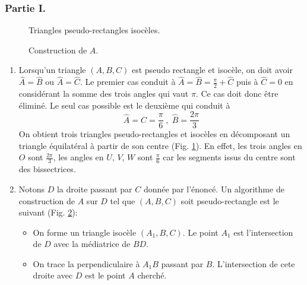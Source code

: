 \subsubsection*{Partie I.}
\begin{figure}
	\begin{center}
	
	\end{center}
\caption{Triangles pseudo-rectangles isocèles.}
\label{fig:Cpseudorec_1}
\end{figure} 
\begin{figure}
	\begin{center}
	
	\end{center}
\caption{Construction de $A$.}
\label{fig:Cpseudorec_2}
\end{figure} 

\begin{enumerate}
\item Lorsqu'un triangle $(A,B,C)$ est pseudo rectangle et isocèle, on doit avoir $\widehat{A}=\widehat{B}$ ou $\widehat{A}=\widehat{C}$. Le premier cas conduit à $\widehat{A}=\widehat{B}=\frac{\pi}{2}+\widehat{C}$  puis à $\widehat{C}=0$ en considérant la somme des trois angles qui vaut $\pi$. Ce cas doit donc être éliminé.\newline
Le seul cas possible est le deuxième qui conduit à
\[\widehat{A}=\widehat{C}=\frac{\pi}{6}\;,\;\widehat{B}=\frac{2\pi}{3}\]
On obtient trois triangles pseudo-rectangles et isocèles en décomposant un triangle équilatéral à partir de son centre (Fig. \ref{fig:Cpseudorec_1}). En effet, les trois angles en $O$ sont $\frac{2\pi}{3}$, les angles en $U$, $V$, $W$ sont $\frac{\pi}{6}$ car les segments issus du centre sont des bissectrices.
\item Notons $D$ la droite passant par $C$ donnée par l'énoncé. Un algorithme de construction de $A$ sur $D$ tel que $(A,B,C)$ soit pseudo-rectangle est le suivant (Fig. \ref{fig:Cpseudorec_2}):
\begin{itemize}
\item On forme un triangle isocèle $(A_1, B, C)$. Le point $A_1$ est l'intersection de $D$ avec la médiatrice de $BD$.
\item On trace la perpendiculaire à $A_1B$ passant par $B$. L'intersection de cete droite avec $D$ est le point $A$ cherché.
\end{itemize}
\end{enumerate}
